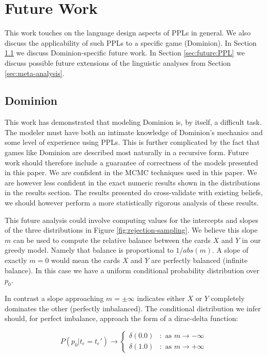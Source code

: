 
\section{Future Work} \label{sec:future}

This work touches on the language design aspects of PPLs
in general. We also discuss the applicability of such PPLs
to a specific game (Dominion). In Section \ref{sec:future:dominion}
we discuss Dominion-specific future work. In Section \ref{sec:future:PPL}
we discuss possible future extensions of the linguistic analyses from
Section \ref{sec:meta-analysis}.

\subsection{Dominion} \label{sec:future:dominion}

This work has demonstrated that modeling Dominion is, by itself,
a difficult task. The modeler must have both an intimate knowledge
of Dominion's mechanics and some level of experience using PPLs.
This is further complicated by the fact that games like Dominion
are described most naturally in a recursive form. Future work should
therefore include a guarantee of correctness of the models presented
in this paper. We are confident in the MCMC techniques used in this
paper. We are however less confident in the exact numeric results
shown in the distributions in the results section. The results
presented do cross-validate with existing beliefs, we should however
perform a more statistically rigorous analysis of these
results.

This future analysis could involve computing values for the
intercepts and slopes of the three distributions in Figure
\ref{fig:rejection-sampling}. We believe this slope $m$ can be used
to compute the relative balance between the cards $X$ and $Y$ in
our greedy model. Namely that balance is proportional to
$1 / abs(m)$. A slope of exactly $m = 0$ would mean the cards
$X$ and $Y$ are perfectly balanced (infinite balance). In
this case we have a uniform conditional probability distribution
over $p_0$.

In contrast
a slope approaching $m = \pm \infty$ indicates either $X$ or $Y$
completely dominates the other (perfectly imbalanced). The
conditional distribution we infer should, for perfect imbalance,
approach the form of a dirac-delta function:

$$P(p_0 | t_e = t_e') \rightarrow \left\{
  \begin{array}{lr}
    \delta(0.0) & : \textrm{ as } m \rightarrow -\infty \\
    \delta(1.0) & : \textrm{ as } m \rightarrow +\infty
  \end{array}
\right.
$$

